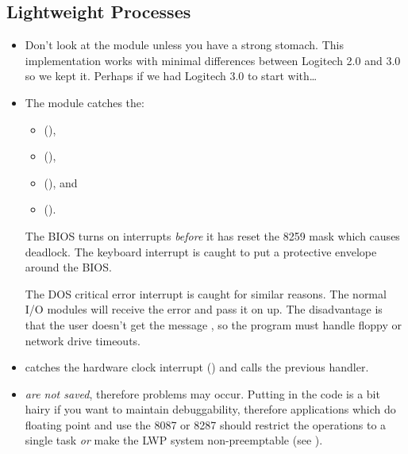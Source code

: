 \subsection{Lightweight Processes}
\begin{itemize}
\item
    Don't look at the module  unless you have
    a strong stomach.  This implementation works with minimal
    differences between Logitech 2.0 and 3.0 so we kept it.  Perhaps
    if we had Logitech 3.0 to start with\ldots
    
\item	
    The module  catches the: 
    \begin{itemize}
    \item
	 (),
    \item
	 (),
    \item
	 (), and
    \item
	 ().
    \end{itemize}
    The BIOS turns on interrupts {\em before} it has reset the
    8259 mask which causes deadlock.  The keyboard interrupt
    is caught to put a protective envelope around the BIOS.
    
    The DOS critical error interrupt is caught for similar reasons.
    The normal I/O modules will receive the error and pass it on up.
    The disadvantage is that the user doesn't get the message
    , so the program must handle
    floppy or network drive timeouts.
\item
     catches the hardware clock interrupt ()
    and calls the previous handler.
\item
     {\em are not saved}, therefore problems
    may occur.  Putting in the code is a bit hairy if you want to
    maintain debuggability, therefore applications which do floating
    point and use the 8087 or 8287 should restrict the operations
    to a single task {\em or} make the LWP system non-preemptable
    (see ).
\end{itemize}

